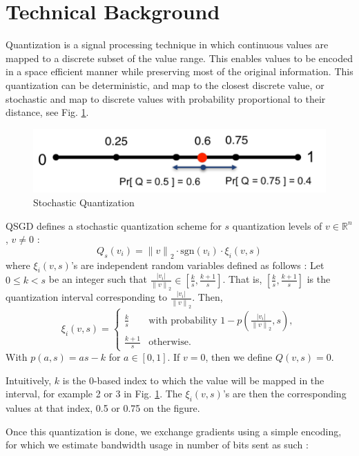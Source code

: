 \documentclass[10pt,conference,compsocconf]{IEEEtran}
\begin{document}
\section{Technical Background}

Quantization is a signal processing technique in which continuous values are mapped to a discrete subset of the value range. This enables values to be encoded in a space efficient manner while preserving most of the original information. This quantization can be deterministic, and map to the closest discrete value, or stochastic and map to discrete values with probability proportional to their distance, see Fig. \ref{fig:quant}. 

\begin{figure}[b]
  \centering
  \includegraphics[scale=0.45]{quant}
  \caption{Stochastic Quantization}
  \vspace{-3mm}
  \label{fig:quant}
\end{figure}

QSGD defines a stochastic quantization scheme for $s$ quantization levels of $v \in \mathbb{R}^{n}$, $v \neq 0$ :
\[Q_s(v_i) = {\lVert v \rVert}_2 \cdot \text{{sgn}}(v_i) \cdot \xi_i(v, s)\]
where $\xi_i(v, s)$'s are independent random variables defined as follows : Let $0 \leq k < s$ be an integer such that $\frac{{\lvert v_i \rvert}}{{\lVert v \rVert}_2} \in [\frac{k}{s}, \frac{k + 1}{s}]$. That is, $[\frac{k}{s}, \frac{k + 1}{s}]$ is the quantization interval corresponding to $\frac{{\lvert v_i \rvert}}{{\lVert v \rVert}_2}$. Then,
\[\xi_i(v, s) = \begin{cases}
\frac{k}{s} & \text{{with probability }} 1 - p\left(\frac{{\lvert v_i \rvert}}{{\lVert v \rVert}_2}, s\right), \\
\frac{k + 1}{s} & \text{{otherwise}}.
\end{cases}\]
With $p(a, s) = as - k$ for $a \in [0, 1]$. If $v = 0$, then we define $Q(v, s) = 0$. 

Intuitively, $k$ is the 0-based index to which the value will be mapped in the interval, for example 2 or 3 in Fig. \ref{fig:quant}. The $\xi_i(v, s)$'s are then the corresponding values at that index, 0.5 or 0.75 on the figure.

Once this quantization is done, we exchange gradients using a simple encoding, for which we estimate bandwidth usage in number of bits sent as such :
\end{document}
